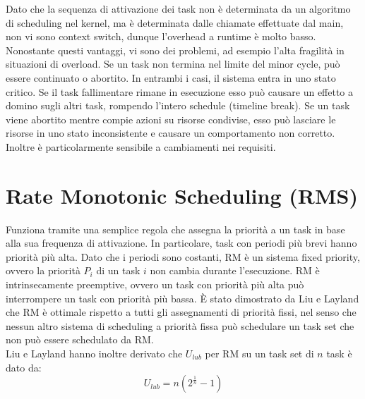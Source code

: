 \documentclass[12pt,openany,onesided]{book}
\begin{document}
Dato che la sequenza di attivazione dei task non è determinata da un algoritmo di scheduling nel kernel, ma è determinata dalle chiamate effettuate dal main, non vi sono context switch, dunque l'overhead a runtime è molto basso.
Nonostante questi vantaggi, vi sono dei problemi, ad esempio l'alta fragilità in situazioni di overload. Se un task non termina nel limite del minor cycle, può essere continuato o abortito.
In entrambi i casi, il sistema entra in uno stato critico.
Se il task fallimentare rimane in esecuzione esso può causare un effetto a domino sugli altri task, rompendo l'intero schedule (timeline break).
Se un task viene abortito mentre compie azioni su risorse condivise, esso può lasciare le risorse in uno stato inconsistente e causare un comportamento non corretto.
Inoltre è particolarmente sensibile a cambiamenti nei requisiti.
\section{Rate Monotonic Scheduling (RMS)}
Funziona tramite una semplice regola che assegna la priorità a un task in base alla sua frequenza di attivazione.
In particolare, task con periodi più brevi hanno priorità più alta.
Dato che i periodi sono costanti, RM è un sistema fixed priority, ovvero la priorità $P_i$ di un task $i$ non cambia durante l'esecuzione.
RM è intrinsecamente preemptive, ovvero un task con priorità più alta può interrompere un task con priorità più bassa.
È stato dimostrato da Liu e Layland che RM è ottimale rispetto a tutti gli assegnamenti di priorità fissi, nel senso che nessun altro sistema di scheduling a priorità fissa può schedulare un task set che non può essere schedulato da RM.
\\
Liu e Layland hanno inoltre derivato che $U_{lub}$ per RM su un task set di $n$ task è dato da:
\begin{equation}
    U_{lub} = n(2^{\frac{1}{n}}-1)
\end{equation}
\end{document}

